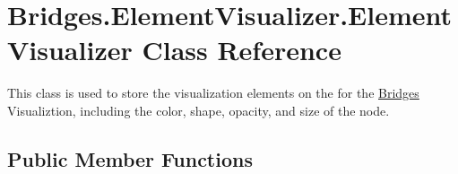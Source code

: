 \hypertarget{class_bridges_1_1_element_visualizer_1_1_element_visualizer}{}\section{Bridges.\+Element\+Visualizer.\+Element\+Visualizer Class Reference}
\label{class_bridges_1_1_element_visualizer_1_1_element_visualizer}


This class is used to store the visualization elements on the for the \mbox{\hyperlink{namespace_bridges_1_1_bridges}{Bridges}} Visualiztion, including the color, shape, opacity, and size of the node.  


\subsection*{Public Member Functions}
